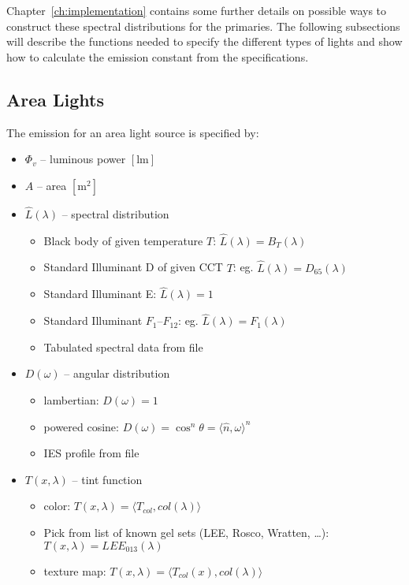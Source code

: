 Chapter~\ref{ch:implementation} contains some further details on possible ways
to construct these spectral distributions for the primaries. The following
subsections will describe the functions needed to specify the different types of
lights and show how to calculate the emission constant from the specifications.

\subsection{Area Lights}

The emission for an area light source is specified by:
\begin{itemize}
\item $\Phi_v$ -- luminous power $[\si{\lumen}]$
\item $A$ -- area $[\si{\square\meter}]$
\item $\hat{L}(\lambda)$ -- spectral distribution
  \begin{itemize}\small\it
  \item Black body of given temperature $T$: $\hat{L}(\lambda) = B_T(\lambda)$
  \item Standard Illuminant D of given CCT $T$: eg. $\hat{L}(\lambda) = D_{65}(\lambda)$
  \item Standard Illuminant E: $\hat{L}(\lambda) = 1$
  \item Standard Illuminant $F_1$--$F_{12}$: eg. $\hat{L}(\lambda) = F_1(\lambda)$
  \item Tabulated spectral data from file
  \end{itemize}
\item $D(\omega)$ -- angular distribution
  \begin{itemize}\small\it
  \item lambertian: $D(\omega) = 1$
  \item powered cosine: $D(\omega) = \cos^n \theta = \langle \hat n,\omega \rangle^n$
  \item IES profile from file
  \end{itemize}
\item $T(x,\lambda)$ -- tint function
  \begin{itemize}\small\it
  \item color: $T(x,\lambda) = \langle T_{col}, col(\lambda)\rangle$
  \item Pick from list of known gel sets (LEE, Rosco, Wratten, \ldots): $T(x, \lambda) = LEE_{013} (\lambda)$
  \item texture map: $T(x,\lambda) = \langle T_{col}(x), col(\lambda)\rangle$
  \end{itemize}
\end{itemize}

